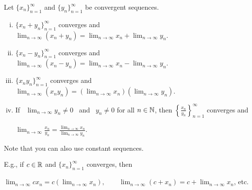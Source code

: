 \documentclass[10pt,aspectratio=169]{beamer}
\begin{document}
\begin{frame}
\begin{proposition}
Let $\{ x_n \}_{n=1}^\infty$ and $\{ y_n \}_{n=1}^\infty$ be convergent sequences.
\pause
\begin{enumerate}[(i)]
\item \label{prop:contalg:i}
$\{ x_n + y_n \}_{n=1}^\infty$ converges and
$\displaystyle
\lim_{n \to \infty} (x_n + y_n) = 
\lim_{n \to \infty} x_n + 
\lim_{n \to \infty} y_n$.
\item \label{prop:contalg:ii}
\pause
$\{ x_n - y_n \}_{n=1}^\infty$ converges and
$\displaystyle
\lim_{n \to \infty} (x_n - y_n) = 
\lim_{n \to \infty} x_n - 
\lim_{n \to \infty} y_n$.
\item \label{prop:contalg:iii}
\pause
$\{ x_n y_n \}_{n=1}^\infty$ converges and
$\displaystyle
\lim_{n \to \infty} (x_n y_n) = 
\left( \lim_{n \to \infty} x_n \right)
\left( \lim_{n \to \infty} y_n \right)$.
\item \label{prop:contalg:iv}
\pause
If ~$\displaystyle \lim_{n\to\infty} y_n \not= 0$~ and ~$y_n \not= 0$ for all $n \in {\mathbb{N}}$, then
$\left\{ \frac{x_n}{y_n} \right\}_{n=1}^\infty$ converges and

$\displaystyle
\lim_{n \to \infty} \frac{x_n}{y_n} = 
\frac{\lim_{n\to\infty} x_n}{\lim_{n\to\infty} y_n}$.
\end{enumerate}
\end{proposition}

\pause

Note that you can also use constant sequences.

\pause

E.g., if $c \in {\mathbb{R}}$ and $\{ x_n \}_{n=1}^\infty$ converges, then

$\displaystyle
\lim_{n \to \infty} c x_n = 
c \left( \lim_{n \to \infty} x_n \right), \qquad
\lim_{n \to \infty} (c + x_n) = 
c + \lim_{n \to \infty} x_n$, \qquad etc.

\end{frame}
\end{document}
